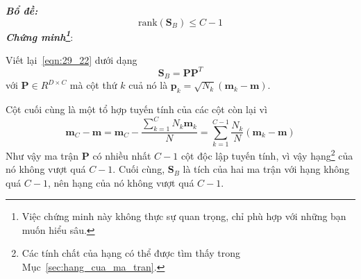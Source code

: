 \textit{\textbf{Bổ đề:}}
\begin{equation}
\text{rank}(\mathbf{S}_B) \leq C - 1
\end{equation}
\textit{\textbf{Chứng minh\footnote{Việc chứng minh này không thực sự quan trọng, chỉ
phù hợp với những bạn muốn hiểu sâu.}}}:

Viết lại~\ref{eqn:29_22} dưới dạng
\begin{equation}
\mathbf{S}_B = \mathbf{P}\mathbf{P}^T
\end{equation}
với $\mathbf{P} \in {R}^{D \times C}$ mà cột thứ $k$ cuả nó là
\begin{math}
\mathbf{p}_k = \sqrt{N_k} (\mathbf{m}_k - \mathbf{m})
\end{math}.

Cột cuối cùng là một tổ hợp tuyến tính của các cột còn lại vì
\begin{equation}
\mathbf{m}_C - \mathbf{m} = \mathbf{m}_C - \frac{\sum_{k=1}^C N_k \mathbf{m}_k}{N} = \sum_{k=1}^{C-1} \frac{N_k}{N} (\mathbf{m}_k - \mathbf{m})
\end{equation}
Như vậy ma trận $\mathbf{P}$ có nhiều nhất $C-1$ cột độc lập tuyến tính, vì vậy hạng\footnote{Các tính chất của hạng có thể được tìm thấy trong
Mục~\ref{sec:hang_cua_ma_tran}.} của nó không vượt quá $C -1$. Cuối cùng,
$\mathbf{S}_B$ là tích của hai ma trận với hạng không quá $C-1$, nên
hạng của nó không vượt quá $C-1$. \dpcm






